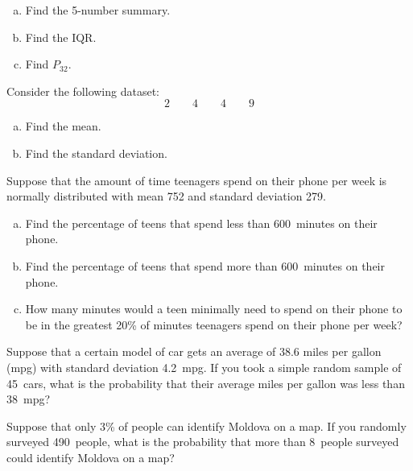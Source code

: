 \documentclass[12pt,letterpaper]{exam}
\begin{document}
\begin{questions}
\begin{enumerate}[(a)]
\item Find the 5-number summary. 
\item Find the IQR. 
\item Find $P_{32}$. 
\end{enumerate}



\newpage
\question[10] Consider the following dataset:
	\[
	2 \qquad 4 \qquad 4 \qquad 9
	\]
	
\begin{enumerate}[(a)]
\item Find the mean. 
\item Find the standard deviation. 
\end{enumerate}



\newpage
\question[10] Suppose that the amount of time teenagers spend on their phone per week is normally distributed with mean 752 and standard deviation 279.
	\begin{enumerate}[(a)]
	\item Find the percentage of teens that spend less than 600~minutes on their phone.
	\item Find the percentage of teens that spend more than 600~minutes on their phone. 
	\item How many minutes would a teen minimally need to spend on their phone to be in the greatest 20\% of minutes teenagers spend on their phone per week?
	\end{enumerate}



\newpage
\question[10] Suppose that a certain model of car gets an average of 38.6 miles per gallon (mpg) with standard deviation 4.2~mpg. If you took a simple random sample of 45~cars, what is the probability that their average miles per gallon was less than 38~mpg?



\newpage
\question[10] Suppose that only 3\% of people can identify Moldova on a map. If you randomly surveyed 490~people, what is the probability that more than 8~people surveyed could identify Moldova on a map? 


\end{questions}
\end{document}
